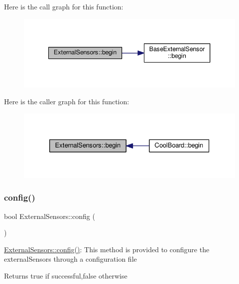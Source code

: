 Here is the call graph for this function\+:\nopagebreak
\begin{figure}[H]
\begin{center}
\leavevmode
\includegraphics[width=340pt]{classExternalSensors_a58ede0d786a86417254708870f04a21e_cgraph}
\end{center}
\end{figure}
Here is the caller graph for this function\+:\nopagebreak
\begin{figure}[H]
\begin{center}
\leavevmode
\includegraphics[width=326pt]{classExternalSensors_a58ede0d786a86417254708870f04a21e_icgraph}
\end{center}
\end{figure}
\mbox{\label{classExternalSensors_a862a4bd11346b37270d0244c2adabe5a}} 
\subsubsection{\texorpdfstring{config()}{config()}}
{\footnotesize\ttfamily bool External\+Sensors\+::config (\begin{DoxyParamCaption}{ }\end{DoxyParamCaption})}

\hyperlink{classExternalSensors_a862a4bd11346b37270d0244c2adabe5a}{External\+Sensors\+::config()}\+: This method is provided to configure the external\+Sensors through a configuration file

\begin{DoxyReturn}{Returns}
true if successful,false otherwise 
\end{DoxyReturn}


